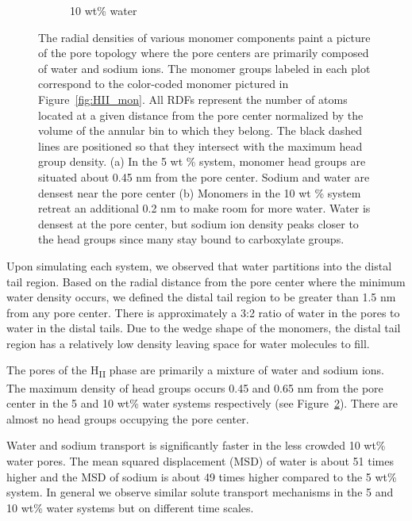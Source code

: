 \documentclass{article}
\begin{document}
\begin{figure}
\begin{subfigure}{0.49\linewidth}
  \caption{10 wt\% water}\label{fig:component_density_10wt}
  \end{subfigure}
  \caption{The radial densities of various monomer components paint a
  picture of the pore topology where the pore centers are primarily composed
  of water and sodium ions. The monomer groups labeled in each plot correspond to
  the color-coded monomer pictured in Figure~\ref{fig:HII_mon}. All RDFs
  represent the number of atoms located at a given distance from the pore center
  normalized by the volume of the annular bin to which they belong. The black
  dashed lines are positioned so that they intersect with the maximum head group
  density. (a) In the 5 wt \% system, monomer head groups are situated about 0.45 nm
  from the pore center. Sodium and water are densest near the pore center 
  (b) Monomers in the 10 wt \% system retreat an additional 0.2 nm to make room
  for more water. Water is densest at the pore center, but sodium ion density
  peaks closer to the head groups since many stay bound to carboxylate groups.}\label{fig:component_densities}
  \vspace{-0.75cm}
  \end{figure}
  
  Upon simulating each system, we observed that water partitions into the
  distal tail region. Based on the radial distance from the pore center where 
  the minimum water density occurs, we defined the distal tail region to 
  be greater than 1.5 nm from any pore center. There
  is approximately a 3:2 ratio of water in the pores to water in the 
  distal tails. Due to the wedge shape of the monomers, the distal tail
  region has a relatively low density leaving space for water molecules 
  to fill.
  
  The pores of the H\textsubscript{II} phase are primarily a mixture of 
  water and sodium ions. The maximum density of head groups occurs 0.45
  and 0.65 nm from the pore center in the 5 and 10 wt\% water systems 
  respectively (see Figure~\ref{fig:component_densities}). There are 
  almost no head groups occupying the pore center.
  
  Water and sodium transport is significantly faster in the less crowded 
  10 wt\% water pores. The mean squared displacement (MSD) of water is about
  51 times higher and the MSD of sodium is about 49 times higher compared to
  the 5 wt\% system. In general we observe similar solute transport mechanisms
  in the 5 and 10 wt\% water systems but on different time scales.
  
\end{document}
